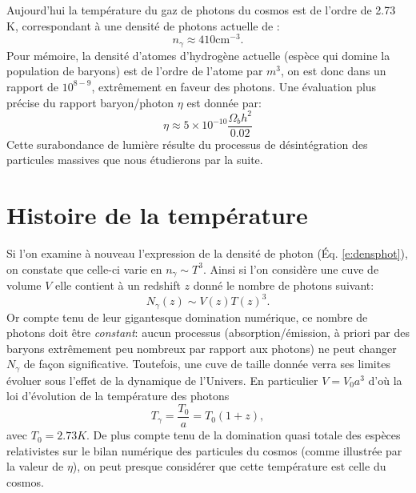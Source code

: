 Aujourd'hui la température du gaz de photons du cosmos est de l'ordre de 2.73 K, correspondant à une densité de photons actuelle de :
\begin{equation}
n_\gamma\approx 410 \mathrm{cm}^{-3}.
\end{equation}
Pour mémoire, la densité d'atomes d'hydrogène actuelle (espèce qui domine la population de baryons) est de l'ordre de l'atome par $m^3$, on est donc dans un rapport de $10^{8-9}$,  extrêmement en faveur des photons. Une évaluation plus précise du rapport baryon/photon $\eta$ est donnée par:
\begin{equation}
\eta \approx 5\times 10^{-10}\frac{\Omega_b h^2}{0.02}
\end{equation}
Cette surabondance de lumière résulte du processus de désintégration des particules massives que nous étudierons par la suite. 

\section{Histoire de la température}

Si l'on examine à nouveau l'expression de la densité de photon (Éq. \ref{e:densphot}), on constate que celle-ci varie en $n_\gamma \sim T^3$. Ainsi si l'on considère une cuve de volume $V$ elle contient à un redshift $z$ donné le nombre de photons suivant:
\begin{equation}
N_\gamma(z) \sim V(z) T(z)^3.
\end{equation}
Or compte tenu de leur gigantesque domination numérique, ce nombre de photons doit être \textit{constant}: aucun processus (absorption/émission, à priori par des baryons extrêmement peu nombreux par rapport aux photons) ne peut changer $N_\gamma$ de façon significative. Toutefois, une cuve de taille donnée verra ses limites évoluer sous l'effet de la dynamique de l'Univers. En particulier $V=V_0 a^3$ d'où la loi d'évolution de la température des photons
\begin{equation}
T_\gamma=\frac{T_0}{a}=T_0 (1+z),
\end{equation}
avec $T_0=2.73K$. De plus compte tenu de la domination quasi totale des espèces relativistes sur le bilan numérique des particules du cosmos (comme illustrée par la valeur de $\eta$), on peut presque considérer que cette température est celle du cosmos. 

